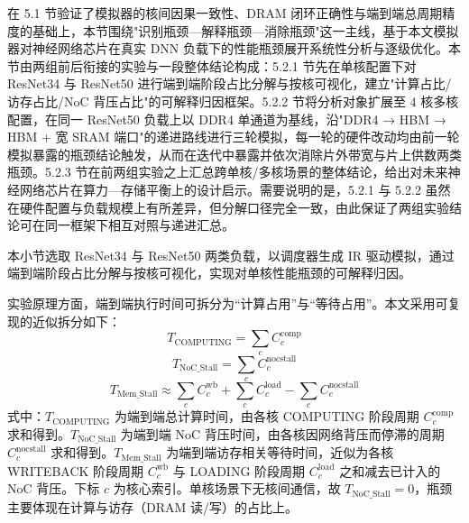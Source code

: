 
在 5.1 节验证了模拟器的核间因果一致性、DRAM 闭环正确性与端到端总周期精度的基础上，本节围绕"识别瓶颈—解释瓶颈—消除瓶颈"这一主线，基于本文模拟器对神经网络芯片在真实 DNN 负载下的性能瓶颈展开系统性分析与逐级优化。本节由两组前后衔接的实验与一段整体结论构成：5.2.1 节先在单核配置下对 ResNet34 与 ResNet50 进行端到端阶段占比分解与按核可视化，建立"计算占比/访存占比/NoC 背压占比"的可解释归因框架。5.2.2 节将分析对象扩展至 4 核多核配置，在同一 ResNet50 负载上以 DDR4 单通道为基线，沿"DDR4 → HBM → HBM + 宽 SRAM 端口"的递进路线进行三轮模拟，每一轮的硬件改动均由前一轮模拟暴露的瓶颈结论触发，从而在迭代中暴露并依次消除片外带宽与片上供数两类瓶颈。5.2.3 节在前两组实验之上汇总跨单核/多核场景的整体结论，给出对未来神经网络芯片在算力—存储平衡上的设计启示。需要说明的是，5.2.1 与 5.2.2 虽然在硬件配置与负载规模上有所差异，但分解口径完全一致，由此保证了两组实验结论可在同一框架下相互对照与递进汇总。

\label{subsec:c5_singlecore}

本小节选取 ResNet34 与 ResNet50 两类负载，以调度器生成 IR 驱动模拟，通过端到端阶段占比分解与按核可视化，实现对单核性能瓶颈的可解释归因。

实验原理方面，端到端执行时间可拆分为“计算占用”与“等待占用”。本文采用可复现的近似拆分如下：
\begin{equation}
  T_\text{COMPUTING} = \sum_c C^\text{comp}_c\label{eqn:c5:bottleneck_compute}
\end{equation}
\begin{equation}
  T_\text{NoC\_Stall} = \sum_c C^\text{nocstall}_c\label{eqn:c5:bottleneck_nocstall}
\end{equation}
\begin{equation}
  T_\text{Mem\_Stall} \approx \sum_c C^\text{wb}_c + \sum_c C^\text{load}_c - \sum_c C^\text{nocstall}_c\label{eqn:c5:bottleneck_memstall}
\end{equation}
式中：$T_\text{COMPUTING}$ 为端到端总计算时间，由各核 COMPUTING 阶段周期 $C^\text{comp}_c$ 求和得到。$T_\text{NoC\_Stall}$ 为端到端 NoC 背压时间，由各核因网络背压而停滞的周期 $C^\text{nocstall}_c$ 求和得到。$T_\text{Mem\_Stall}$ 为端到端访存相关等待时间，近似为各核 WRITEBACK 阶段周期 $C^\text{wb}_c$ 与 LOADING 阶段周期 $C^\text{load}_c$ 之和减去已计入的 NoC 背压。下标 $c$ 为核心索引。单核场景下无核间通信，故 $T_\text{NoC\_Stall}=0$，瓶颈主要体现在计算与访存（DRAM 读/写）的占比上。

